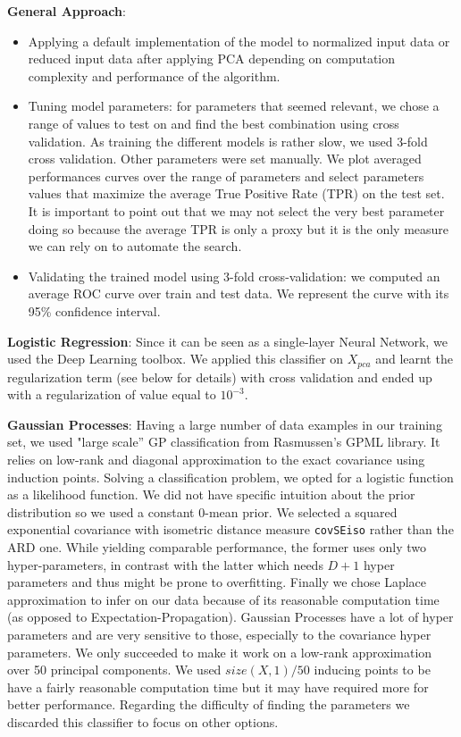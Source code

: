 \documentclass[10pt,a4paper]{article}
\begin{document}
  \textbf{General Approach}:
   	\begin{itemize}
	   	\item Applying a default implementation of the model to normalized input data or reduced input data after applying PCA depending on computation complexity and performance of the algorithm.
    		\item Tuning model parameters: for parameters that seemed relevant, we chose a range of values to test on and find the best combination using cross validation. As training the different models is rather slow, we used 3-fold cross validation. Other parameters were set manually. We plot averaged performances curves over the range of parameters and select parameters values that maximize the average True Positive Rate (TPR) on the test set. It is important to point out that we may not select the very best parameter doing so because the average TPR is only a proxy but it is the only measure we can rely on to automate the search.
		  \item Validating the trained model using 3-fold cross-validation: we computed an average ROC curve over train and test data. We represent the curve with its 95\% confidence interval.
	\end{itemize}

  \textbf{Logistic Regression}: Since it can be seen as a single-layer Neural Network, we used the Deep Learning toolbox. We applied this classifier on $X_{pca}$ and learnt the regularization term (see below for details) with cross validation and ended up with a regularization of value equal to $10^{-3}$.

  \textbf{Gaussian Processes}: Having a large number of data examples in our training set, we used "large scale'' GP classification from Rasmussen's GPML library. It relies on low-rank and diagonal approximation to the exact covariance using induction points. Solving a classification problem, we opted for a logistic function as a likelihood function. We did not have specific intuition about the prior distribution so we used a constant 0-mean prior. We selected a squared exponential covariance with isometric distance measure \texttt{covSEiso} rather than the ARD one. While yielding comparable performance, the former uses only two hyper-parameters, in contrast with the latter which needs $D+1$ hyper parameters and thus might be prone to overfitting. Finally we chose Laplace approximation to infer on our data because of its reasonable computation time (as opposed to Expectation-Propagation). Gaussian Processes have a lot of hyper parameters and are very sensitive to those, especially to the covariance hyper parameters. We only succeeded to make it work on a low-rank approximation over 50 principal components. We used $size(X,1) / 50$ inducing points to be have a fairly reasonable computation time but it may have required more for better performance. Regarding the difficulty of finding the parameters we discarded this classifier to focus on other options.
\end{document}
